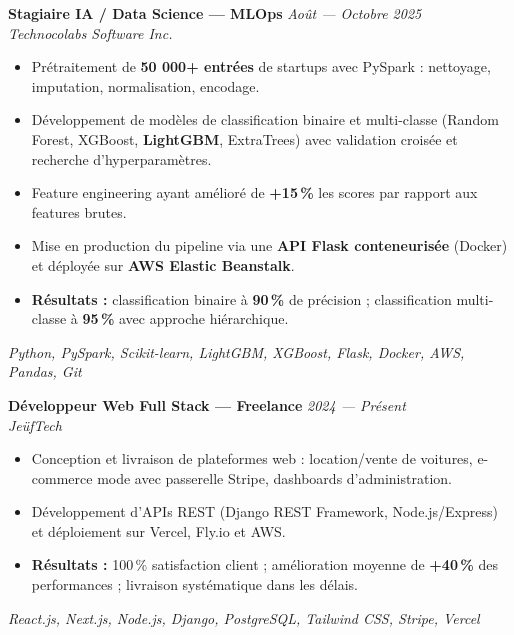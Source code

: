 \documentclass[10pt, a4paper]{article}
\newcommand{\expentry}[3]{%
  \textbf{\normalsize #1} \hfill {\small\color{muted}\textit{#3}}\\
  {\small\color{accent}\textit{#2}}%
}
\begin{document}
\expentry{Stagiaire IA / Data Science — MLOps}
         {Technocolabs Software Inc.}
         {Août — Octobre 2025}

\vspace{4pt}
\begin{itemize}
  \item Prétraitement de \textbf{50 000+ entrées} de startups avec PySpark : nettoyage, imputation, normalisation, encodage.
  \item Développement de modèles de classification binaire et multi-classe (Random Forest, XGBoost, \textbf{LightGBM}, ExtraTrees) avec validation croisée et recherche d'hyperparamètres.
  \item Feature engineering ayant amélioré de \textbf{+15\,\%} les scores par rapport aux features brutes.
  \item Mise en production du pipeline via une \textbf{API Flask conteneurisée} (Docker) et déployée sur \textbf{AWS Elastic Beanstalk}.
  \item \textbf{Résultats :} classification binaire à \textbf{90\,\%} de précision ; classification multi-classe à \textbf{95\,\%} avec approche hiérarchique.
\end{itemize}
\vspace{2pt}
{\small\color{muted}\textit{Python, PySpark, Scikit-learn, LightGBM, XGBoost, Flask, Docker, AWS, Pandas, Git}}

\vspace{8pt}

\expentry{Développeur Web Full Stack — Freelance}
         {JeüfTech}
         {2024 — Présent}

\vspace{4pt}
\begin{itemize}
  \item Conception et livraison de plateformes web : location/vente de voitures, e-commerce mode avec passerelle Stripe, dashboards d'administration.
  \item Développement d'APIs REST (Django REST Framework, Node.js/Express) et déploiement sur Vercel, Fly.io et AWS.
  \item \textbf{Résultats :} 100\,\% satisfaction client ; amélioration moyenne de \textbf{+40\,\%} des performances ; livraison systématique dans les délais.
\end{itemize}
\vspace{2pt}
{\small\color{muted}\textit{React.js, Next.js, Node.js, Django, PostgreSQL, Tailwind CSS, Stripe, Vercel}}

\end{document}
